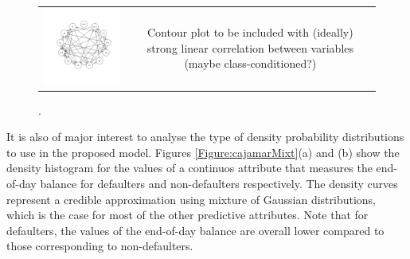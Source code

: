 \begin{figure}
  \centering
    \begin{tabular}{cc}
    \includegraphics[width=70mm]{figures/CajaMarBayesianNetwork}&
    \begin{minipage}[b]{0.45\linewidth} Contour plot to be included with (ideally) strong linear correlation between variables (maybe class-conditioned?) \end{minipage}\\
  \end{tabular}
    \caption{\label{Figure:cajamarDependences}.}
\end{figure}

It is also of major interest to analyse the type of density probability distributions to use in the proposed model. Figures \ref{Figure:cajamarMixt}(a) and (b) show the density histogram for the values of a continuos attribute that measures the end-of-day balance for defaulters and non-defaulters respectively. The density curves represent a credible approximation using mixture of Gaussian distributions, which is the case for most of the other predictive attributes. Note that for defaulters, the values of the end-of-day balance are overall lower compared to those corresponding to non-defaulters.

